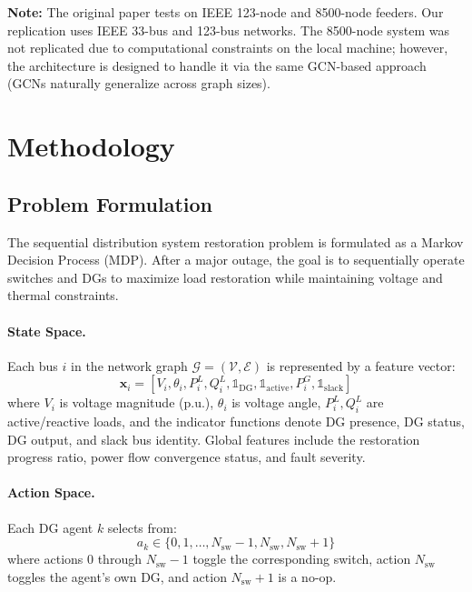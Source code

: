 \documentclass[11pt]{article}
\begin{document}
\noindent\textbf{Note:} The original paper tests on IEEE 123-node and 8500-node feeders. Our replication uses IEEE 33-bus and 123-bus networks. The 8500-node system was not replicated due to computational constraints on the local machine; however, the architecture is designed to handle it via the same GCN-based approach (GCNs naturally generalize across graph sizes).

\section{Methodology}

\subsection{Problem Formulation}

The sequential distribution system restoration problem is formulated as a Markov Decision Process (MDP). After a major outage, the goal is to sequentially operate switches and DGs to maximize load restoration while maintaining voltage and thermal constraints.

\paragraph{State Space.} Each bus $i$ in the network graph $\mathcal{G} = (\mathcal{V}, \mathcal{E})$ is represented by a feature vector:
\begin{equation}
    \mathbf{x}_i = [V_i, \theta_i, P_i^L, Q_i^L, \mathbb{1}_{\text{DG}}, \mathbb{1}_{\text{active}}, P_i^G, \mathbb{1}_{\text{slack}}]
\end{equation}
where $V_i$ is voltage magnitude (p.u.), $\theta_i$ is voltage angle, $P_i^L, Q_i^L$ are active/reactive loads, and the indicator functions denote DG presence, DG status, DG output, and slack bus identity. Global features include the restoration progress ratio, power flow convergence status, and fault severity.

\paragraph{Action Space.} Each DG agent $k$ selects from:
\begin{equation}
    a_k \in \{0, 1, \ldots, N_{\text{sw}}-1, N_{\text{sw}}, N_{\text{sw}}+1\}
\end{equation}
where actions $0$ through $N_{\text{sw}}-1$ toggle the corresponding switch, action $N_{\text{sw}}$ toggles the agent's own DG, and action $N_{\text{sw}}+1$ is a no-op.
\end{document}

